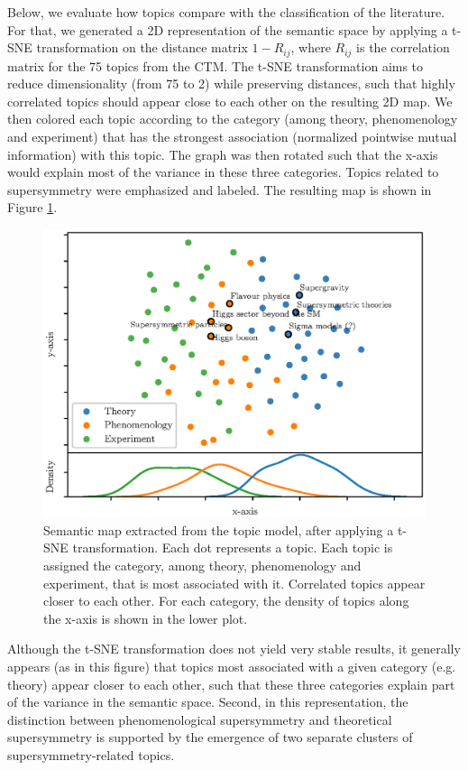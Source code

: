 \documentclass[smallextended]{svjour3}
\begin{document}
Below, we evaluate how topics compare with the classification of the literature. For that, we generated a 2D representation of the semantic space by applying a t-SNE transformation \citep{Maaten2008} on the distance matrix $1-R_{ij}$, where $R_{ij}$ is the correlation matrix for the 75 topics from the CTM. The t-SNE transformation aims to reduce dimensionality (from 75 to 2) while preserving distances, such that highly correlated topics should appear close to each other on the resulting 2D map. We then colored each topic according to the category (among theory, phenomenology and experiment) that has the strongest association (normalized pointwise mutual information) with this topic. The graph was then rotated such that the x-axis would explain most of the variance in these three categories. Topics related to supersymmetry were emphasized and labeled. The resulting map is shown in Figure \ref{fig:tsne}.

\begin{figure}
\centering
\includegraphics{Fig9.eps}
\caption{\label{fig:tsne}Semantic map extracted from the topic model, after applying a t-SNE transformation. Each dot represents a topic. Each topic is assigned the category, among theory, phenomenology and experiment, that is most associated with it. Correlated topics appear closer to each other. For each category, the density of topics along the x-axis is shown in the lower plot.}
\end{figure}

Although the t-SNE transformation does not yield very stable results, it generally appears (as in this figure) that topics most associated with a given category (e.g. theory) appear closer to each other, such that these three categories explain part of the variance in the semantic space. Second, in this representation, the distinction between phenomenological supersymmetry and theoretical supersymmetry is supported by the emergence of two separate clusters of supersymmetry-related topics.
\end{document}
